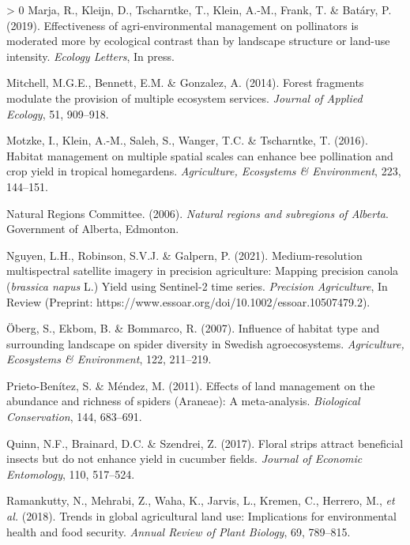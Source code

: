 \documentclass[]{elsarticle} %
\newlength{\cslhangindent}
\newenvironment{CSLReferences}[3] %
 {%
  \setlength{\parindent}{0pt}
  \ifodd #1 \everypar{\setlength{\hangindent}{\cslhangindent}}\ignorespaces\fi
  \ifnum #2 > 0
  \setlength{\parskip}{#2\baselineskip}
  \fi
 }%
 {}
\begin{document}
\begin{CSLReferences}{1}{0}
\leavevmode\hypertarget{ref-marja2019}{}%
Marja, R., Kleijn, D., Tscharntke, T., Klein, A.-M., Frank, T. \& Batáry, P. (2019). Effectiveness of agri-environmental management on pollinators is moderated more by ecological contrast than by landscape structure or land-use intensity. \emph{Ecology Letters}, In press.

\leavevmode\hypertarget{ref-mitchell2014}{}%
Mitchell, M.G.E., Bennett, E.M. \& Gonzalez, A. (2014). Forest fragments modulate the provision of multiple ecosystem services. \emph{Journal of Applied Ecology}, 51, 909--918.

\leavevmode\hypertarget{ref-motzke2016}{}%
Motzke, I., Klein, A.-M., Saleh, S., Wanger, T.C. \& Tscharntke, T. (2016). Habitat management on multiple spatial scales can enhance bee pollination and crop yield in tropical homegardens. \emph{Agriculture, Ecosystems \& Environment}, 223, 144--151.

\leavevmode\hypertarget{ref-ABRegions2006}{}%
Natural Regions Committee. (2006). \emph{Natural regions and subregions of {Alberta}}. Government of Alberta, Edmonton.

\leavevmode\hypertarget{ref-nguyen2021}{}%
Nguyen, L.H., Robinson, S.V.J. \& Galpern, P. (2021). Medium-resolution multispectral satellite imagery in precision agriculture: Mapping precision canola (\emph{brassica napus} {L.}) Yield using {Sentinel-2} time series. \emph{Precision Agriculture}, In Review (Preprint: https://www.essoar.org/doi/10.1002/essoar.10507479.2).

\leavevmode\hypertarget{ref-oberg2007}{}%
Öberg, S., Ekbom, B. \& Bommarco, R. (2007). Influence of habitat type and surrounding landscape on spider diversity in {Swedish} agroecosystems. \emph{Agriculture, Ecosystems {\&} Environment}, 122, 211--219.

\leavevmode\hypertarget{ref-prietoBenitez2011}{}%
Prieto-Benítez, S. \& Méndez, M. (2011). Effects of land management on the abundance and richness of spiders ({Araneae}): A meta-analysis. \emph{Biological Conservation}, 144, 683--691.

\leavevmode\hypertarget{ref-quinn2017}{}%
Quinn, N.F., Brainard, D.C. \& Szendrei, Z. (2017). Floral strips attract beneficial insects but do not enhance yield in cucumber fields. \emph{Journal of Economic Entomology}, 110, 517--524.

\leavevmode\hypertarget{ref-ramankutty2018}{}%
Ramankutty, N., Mehrabi, Z., Waha, K., Jarvis, L., Kremen, C., Herrero, M., \emph{et al.} (2018). Trends in global agricultural land use: Implications for environmental health and food security. \emph{Annual Review of Plant Biology}, 69, 789--815.


\end{CSLReferences}
\end{document}

